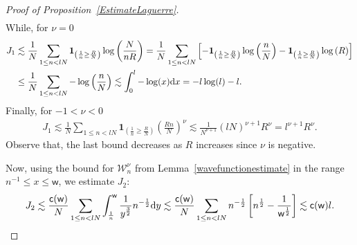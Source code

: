 \begin{proof}[Proof of Proposition~\ref{EstimateLaguerre}]
\begin{gather*}
\end{gather*}
While, for $\nu=0$
\begin{align*}
J_1 & \lesssim \frac{1}{N} \sum_{1 \le n <lN}^{}\textbf{1}_{\left(\frac{1}{n}\ge \frac{R}{N}\right)} \log \left(\frac{N}{nR}\right)=\frac{1}{N}\sum_{1 \le n <lN}^{}\left[-\textbf{1}_{\left(\frac{1}{n}\ge \frac{R}{N}\right)} \log \left(\frac{n}{N}\right)-\textbf{1}_{\left(\frac{1}{n}\ge \frac{R}{N}\right)} \log \left(R\right)\right]\\
 &\le \frac{1}{N}\sum_{1 \le n <lN}^{}- \log \left(\frac{n}{N}\right) \lesssim \int_{0}^{l}-\log(x){\rm d}x=-l\log(l)-l.
\end{align*}
Finally, for $-1<\nu<0$
\begin{gather*}
J_1 \lesssim \frac{1}{N} \sum_{1 \le n <lN}^{}\textbf{1}_{\left(\frac{1}{n}\ge \frac{R}{N}\right)} \left(\frac{Rn}{N}\right)^\nu \lesssim \frac{1}{N^{\nu+1}}\left(lN\right)^{\nu+1}R^\nu=l^{\nu+1}R^\nu.
\end{gather*}
Observe that, the last bound decreases as $R$ increases since $\nu$ is negative.

Now, using the bound for $\mathcal{W}_n^{\nu}$ from Lemma~\ref{wavefunctionestimate} in the range $n^{-1} \le x \le \mathsf{w}$, we estimate $J_2$:
\begin{gather*}
J_2 \lesssim \frac{\mathsf{c}(\mathsf{w})}{N} \sum_{1 \le n < lN}^{} \int_{\frac{1}{n}}^{\mathsf{w}} \frac{1}{y^{\frac{3}{2}}}n^{-\frac{1}{2}}{\rm d}y \lesssim \frac{\mathsf{c}(\mathsf{w})}{N} \sum_{1 \le n < lN}^{}n^{-\frac{1}{2}} \left[n^{\frac{1}{2}}-\frac{1}{\mathsf{w}^{\frac{1}{2}}}\right] \lesssim \mathsf{c}(\mathsf{w})l.
\end{gather*}


\end{proof}
